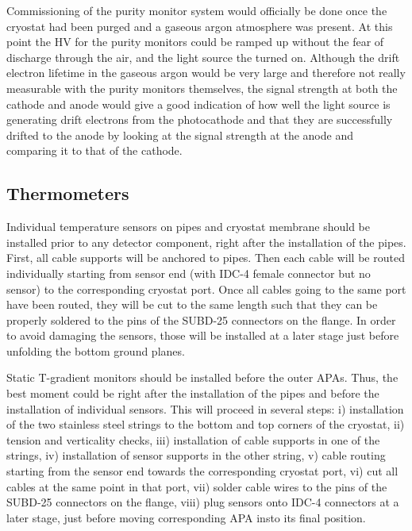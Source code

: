 Commissioning of the purity monitor system would officially be done once the cryostat had been purged and a gaseous argon atmosphere was present.  At this point the HV for the purity monitors could be ramped up without the fear of discharge through the air, and the light source the turned on.  Although the drift electron lifetime in the gaseous argon would be very large and therefore not really measurable with the purity monitors themselves, the signal strength at both the cathode and anode would give a good indication of how well the light source is generating drift electrons from the photocathode and that they are successfully drifted to the anode by looking at the signal strength at the anode and comparing it to that of the cathode.


\subsection{Thermometers}
\label{sec:fdgen-slow-cryo-instal-th}


Individual temperature sensors on pipes and cryostat membrane should be installed prior to any detector component, right after the installation of the pipes.
First, all cable supports will be anchored to pipes. Then each cable will be routed individually starting from sensor end (with IDC-4 female connector but no sensor)
to the corresponding cryostat port. Once all cables going to the same port have been routed, they will be cut to the same length such that they can be properly soldered
to the pins of the SUBD-25 connectors on the flange. In order to avoid damaging the sensors, those will be installed at a later stage just before unfolding the bottom ground planes.

Static T-gradient monitors should be installed before the outer APAs. Thus, the best moment could be right after the installation of the pipes
and before the installation of individual sensors. This will proceed in several steps: i) installation of the two stainless steel strings to the bottom and top corners of the cryostat,
ii) tension and verticality checks, iii) installation of cable supports in one of the strings, iv) installation of sensor supports in the other string, v) cable routing starting from
the sensor end towards the corresponding cryostat port, vi) cut all cables at the same point in that port, vii) solder cable wires to the pins of the SUBD-25 connectors on the flange,
viii) plug sensors onto IDC-4 connectors at a later stage, just before moving corresponding APA insto its final position. 

